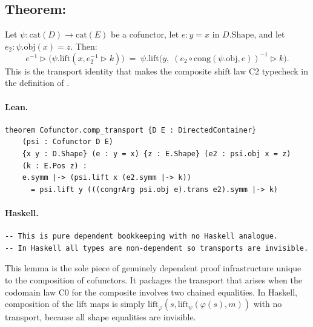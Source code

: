 \documentclass[11pt,a4paper]{article}
\begin{document}
\subsection{Theorem: }

\begin{thm}
Let $\psi : \mathrm{cat}(D) \to \mathrm{cat}(E)$ be a cofunctor, let
$e : y = x$ in $D.\mathrm{Shape}$, and let $e_2 : \psi.\mathrm{obj}(x) = z$.
Then:
\[
  e^{-1} \triangleright
  \bigl(\psi.\mathrm{lift}(x, e_2^{-1} \triangleright k)\bigr)
  \;=\;
  \psi.\mathrm{lift}\bigl(y,\; (e_2 \circ \mathrm{cong}(\psi.\mathrm{obj}, e))^{-1}
    \triangleright k\bigr).
\]
This is the transport identity that makes the composite shift law C2 typecheck
in the definition of .
\end{thm}

\paragraph{Lean.}
\begin{lstlisting}[style=lean]
theorem Cofunctor.comp_transport {D E : DirectedContainer}
    (psi : Cofunctor D E)
    {x y : D.Shape} (e : y = x) {z : E.Shape} (e2 : psi.obj x = z)
    (k : E.Pos z) :
    e.symm |-> (psi.lift x (e2.symm |-> k))
      = psi.lift y (((congrArg psi.obj e).trans e2).symm |-> k)
\end{lstlisting}

\paragraph{Haskell.}
\begin{lstlisting}[style=haskell]
-- This is pure dependent bookkeeping with no Haskell analogue.
-- In Haskell all types are non-dependent so transports are invisible.
\end{lstlisting}

\begin{fidelitynote}
This lemma is the sole piece of genuinely dependent proof infrastructure
unique to the composition of cofunctors.  It packages the transport that arises
when the codomain law C0 for the composite involves two chained equalities.
In Haskell, composition of the lift maps is simply
$\mathrm{lift}_\varphi(s, \mathrm{lift}_\psi(\varphi(s), m))$ with no
transport, because all shape equalities are invisible.
\end{fidelitynote}
\end{document}
